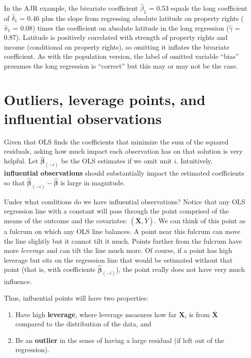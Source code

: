 \documentclass[
  13pt,
  letterpaper,
  DIV=11,
  numbers=noendperiod]{scrreprt}
\providecommand{\tightlist}{%
  \setlength{\itemsep}{0pt}\setlength{\parskip}{0pt}}
\newcommand{\mb}{\bm}
\newcommand{\X}{\mb{X}}
\newcommand{\bhat}{\widehat{\mb{\beta}}}
\theoremstyle{plain}
\theoremstyle{plain}
\theoremstyle{definition}
\theoremstyle{definition}
\theoremstyle{remark}
\begin{document}
In the AJR example, the bivariate coefficient \(\widehat{\beta}_1\) =
0.53 equals the long coefficient of \(\widehat{\delta}_1\) = 0.46 plus
the slope from regressing absolute latitude on property rights
(\(\widehat\pi_1\) = 0.08) times the coefficient on absolute latitude in
the long regression (\(\widehat{\gamma}\) = 0.87). Latitude is
positively correlated with strength of property rights and income
(conditional on property rights), so omitting it inflates the bivariate
coefficient. As with the population version, the label of omitted
variable ``bias'' presumes the long regression is ``correct'' but this
may or may not be the case.

\section{Outliers, leverage points, and influential
observations}\label{outliers-leverage-points-and-influential-observations}

Given that OLS finds the coefficients that minimize the sum of the
squared residuals, asking how much impact each observation has on that
solution is very helpful. Let \(\bhat_{(-i)}\) be the OLS estimates if
we omit unit \(i\). Intuitively, \textbf{influential observations}
should substantially impact the estimated coefficients so that
\(\bhat_{(-i)} - \bhat\) is large in magnitude.

Under what conditions do we have influential observations? Notice that
any OLS regression line with a constant will pass through the point
comprised of the means of the outcome and the covariates:
\((\overline{\X}, \overline{Y})\). We can think of this point as a
fulcrum on which any OLS line balances. A point near this fulcrum can
move the line slightly but it cannot tilt it much. Points further from
the fulcrum have more \emph{leverage} and can tilt the line much more.
Of course, if a point has high leverage but sits on the regression line
that would be estimated without that point (that is, with coefficients
\(\bhat_{(-i)}\)), the point really does not have very much influence.

Thus, influential points will have two properties:

\begin{enumerate}
\def\labelenumi{\arabic{enumi}.}
\tightlist
\item
  Have high \textbf{leverage}, where leverage measures how far \(\X_i\)
  is from \(\overline{\X}\) compared to the distribution of the data,
  and
\item
  Be an \textbf{outlier} in the sense of having a large residual (if
  left out of the regression).
\end{enumerate}
\end{document}
